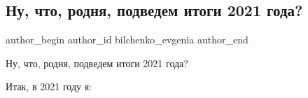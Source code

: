  
 
 
 
 
\subsection{Ну, что, родня, подведем итоги 2021 года?}
\label{sec:29_12_2021.tg.bilchenko_evgenia.1.itogi_goda}

\ifcmt
 author_begin
   author_id bilchenko_evgenia
 author_end
\fi

Ну, что, родня, подведем итоги 2021 года?


Итак, в 2021 году я:

